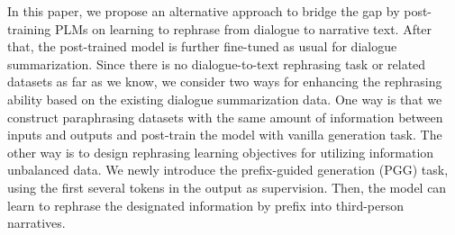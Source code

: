 In this paper, we propose an alternative approach to bridge the gap by post-training PLMs on learning to rephrase from dialogue to narrative text. 
After that, the post-trained model is further fine-tuned as usual 
for dialogue summarization. 
Since there is no dialogue-to-text rephrasing task or related datasets as far as we know, we consider two ways for enhancing the rephrasing ability based on the existing dialogue summarization data.
One way is that we construct paraphrasing datasets with the same amount of information between inputs and outputs and post-train the model with vanilla generation task.
The other way is to design rephrasing learning objectives for utilizing information unbalanced data. We newly introduce the prefix-guided generation (PGG) task, using the first several tokens in the output as supervision. 
Then, the model can learn to rephrase the designated information by prefix into third-person narratives.




